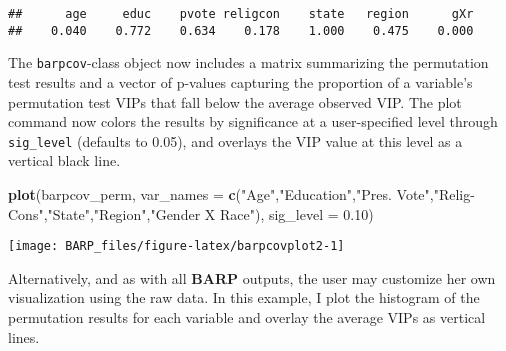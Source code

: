 \documentclass[]{article}
\newenvironment{Shaded}{\begin{snugshade}}{\end{snugshade}}
\newcommand{\KeywordTok}[1]{\textcolor[rgb]{0.13,0.29,0.53}{\textbf{#1}}}
\newcommand{\DataTypeTok}[1]{\textcolor[rgb]{0.13,0.29,0.53}{#1}}
\newcommand{\DecValTok}[1]{\textcolor[rgb]{0.00,0.00,0.81}{#1}}
\newcommand{\FloatTok}[1]{\textcolor[rgb]{0.00,0.00,0.81}{#1}}
\newcommand{\StringTok}[1]{\textcolor[rgb]{0.31,0.60,0.02}{#1}}
\newcommand{\OperatorTok}[1]{\textcolor[rgb]{0.81,0.36,0.00}{\textbf{#1}}}
\newcommand{\NormalTok}[1]{#1}
\begin{document}
\begin{Shaded}
\end{Shaded}

\begin{verbatim}
##      age     educ    pvote religcon    state   region      gXr 
##    0.040    0.772    0.634    0.178    1.000    0.475    0.000
\end{verbatim}

The \texttt{barpcov}-class object now includes a matrix summarizing the
permutation test results and a vector of p-values capturing the
proportion of a variable's permutation test VIPs that fall below the
average observed VIP. The plot command now colors the results by
significance at a user-specified level through \texttt{sig\_level}
(defaults to 0.05), and overlays the VIP value at this level as a
vertical black line.

\begin{Shaded}
\begin{Highlighting}[]
\KeywordTok{plot}\NormalTok{(barpcov_perm,}
     \DataTypeTok{var_names =} \KeywordTok{c}\NormalTok{(}\StringTok{"Age"}\NormalTok{,}\StringTok{"Education"}\NormalTok{,}\StringTok{"Pres. Vote"}\NormalTok{,}\StringTok{"Relig-Cons"}\NormalTok{,}\StringTok{"State"}\NormalTok{,}\StringTok{"Region"}\NormalTok{,}\StringTok{"Gender X Race"}\NormalTok{),}
     \DataTypeTok{sig_level =} \FloatTok{0.10}\NormalTok{)}
\end{Highlighting}
\end{Shaded}

\begin{center}\texttt{[image: BARP\_files/figure-latex/barpcovplot2-1]} \end{center}

Alternatively, and as with all \textbf{BARP} outputs, the user may
customize her own visualization using the raw data. In this example, I
plot the histogram of the permutation results for each variable and
overlay the average VIPs as vertical lines.
\end{document}
